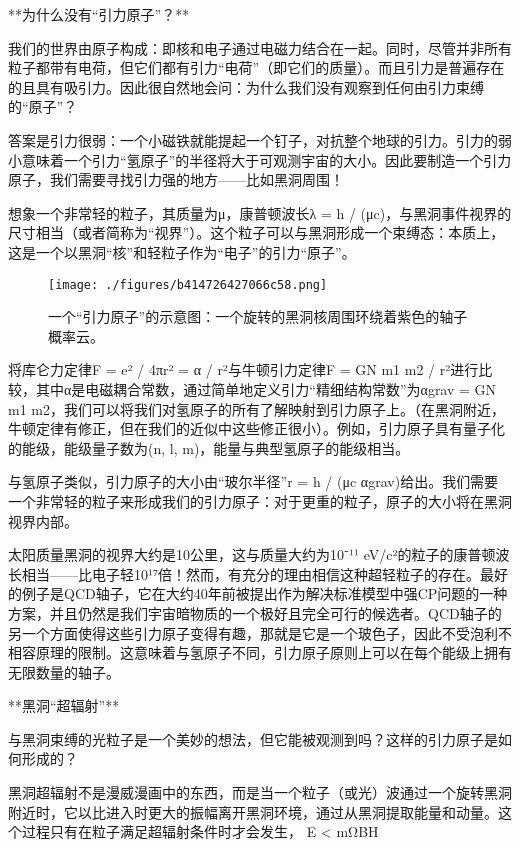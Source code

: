 


**为什么没有“引力原子”？**

我们的世界由原子构成：即核和电子通过电磁力结合在一起。同时，尽管并非所有粒子都带有电荷，但它们都有引力“电荷”（即它们的质量）。而且引力是普遍存在的且具有吸引力。因此很自然地会问：为什么我们没有观察到任何由引力束缚的“原子”？

答案是引力很弱：一个小磁铁就能提起一个钉子，对抗整个地球的引力。引力的弱小意味着一个引力“氢原子”的半径将大于可观测宇宙的大小。因此要制造一个引力原子，我们需要寻找引力强的地方——比如黑洞周围！

想象一个非常轻的粒子，其质量为μ，康普顿波长λ = h / (μc)，与黑洞事件视界的尺寸相当（或者简称为“视界”）。这个粒子可以与黑洞形成一个束缚态：本质上，这是一个以黑洞“核”和轻粒子作为“电子”的引力“原子”。

\begin{figure}[ht]
\centering
\texttt{[image: ./figures/b414726427066c58.png]}
\caption{一个“引力原子”的示意图：一个旋转的黑洞核周围环绕着紫色的轴子概率云。} \label{fig_GAtom_1}
\end{figure}

将库仑力定律F = e² / 4πr² = α / r²与牛顿引力定律F = GN m1 m2 / r²进行比较，其中α是电磁耦合常数，通过简单地定义引力“精细结构常数”为αgrav = GN m1 m2，我们可以将我们对氢原子的所有了解映射到引力原子上。（在黑洞附近，牛顿定律有修正，但在我们的近似中这些修正很小）。例如，引力原子具有量子化的能级，能级量子数为(n, l, m)，能量与典型氢原子的能级相当。

与氢原子类似，引力原子的大小由“玻尔半径”r = h / (μc αgrav)给出。我们需要一个非常轻的粒子来形成我们的引力原子：对于更重的粒子，原子的大小将在黑洞视界内部。

太阳质量黑洞的视界大约是10公里，这与质量大约为10⁻¹¹ eV/c²的粒子的康普顿波长相当——比电子轻10¹⁷倍！然而，有充分的理由相信这种超轻粒子的存在。最好的例子是QCD轴子，它在大约40年前被提出作为解决标准模型中强CP问题的一种方案，并且仍然是我们宇宙暗物质的一个极好且完全可行的候选者。QCD轴子的另一个方面使得这些引力原子变得有趣，那就是它是一个玻色子，因此不受泡利不相容原理的限制。这意味着与氢原子不同，引力原子原则上可以在每个能级上拥有无限数量的轴子。

**黑洞“超辐射”**

与黑洞束缚的光粒子是一个美妙的想法，但它能被观测到吗？这样的引力原子是如何形成的？

黑洞超辐射不是漫威漫画中的东西，而是当一个粒子（或光）波通过一个旋转黑洞附近时，它以比进入时更大的振幅离开黑洞环境，通过从黑洞提取能量和动量。这个过程只有在粒子满足超辐射条件时才会发生，
E < mΩBH

